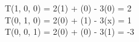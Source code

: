 T(1, 0, 0) = 2(1) + (0) - 3(0) = 2\\
T(0, 1, 0) = 2(0) + (1) - 3(x) = 1\\
T(0, 0, 1) = 2(0) + (0) - 3(1) = -3